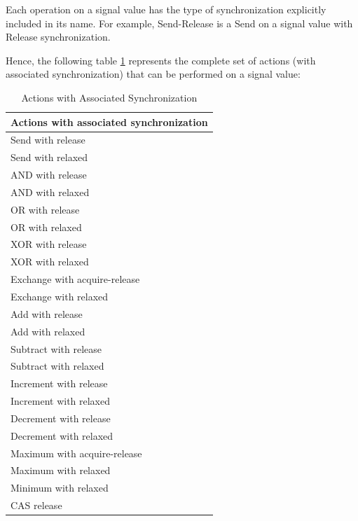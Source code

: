 \documentclass{book}
\begin{document}
Each operation on a signal value has the type of synchronization
explicitly included in its name. For example, Send-Release is a Send
on a signal value with Release synchronization.

Hence, the following table \ref{actionswsync} represents the complete set of actions (with
associated synchronization) that can be performed on a signal value:

\begin{table}[!htbp]
  \begin{center}
    \begin{tabular}{p{4in}}
      \hline
      \textbf{Actions with associated synchronization} \\
      \hline
      Send with release \\
      \hline
      Send with relaxed \\
      \hline
      AND with release \\
      \hline
      AND with relaxed \\
      \hline
      OR with release \\
      \hline
      OR with relaxed \\
      \hline
      XOR with release \\
      \hline
      XOR with relaxed \\
      \hline
      Exchange with acquire-release \\
      \hline
      Exchange with relaxed \\
      \hline
      Add with release \\
      \hline
      Add with relaxed \\
      \hline
      Subtract with release \\
      \hline
      Subtract with relaxed \\
      \hline
      Increment with release \\
      \hline
      Increment with relaxed \\
      \hline
      Decrement with release \\
      \hline
      Decrement with relaxed \\
      \hline
      Maximum with acquire-release \\
      \hline
      Maximum with relaxed \\
      \hline
      Minimum with relaxed \\
      \hline
      CAS release \\
      \hline
    \end{tabular}
  \end{center}
  \caption{Actions with Associated Synchronization}
  \label{actionswsync}
\end{table}
\end{document}
